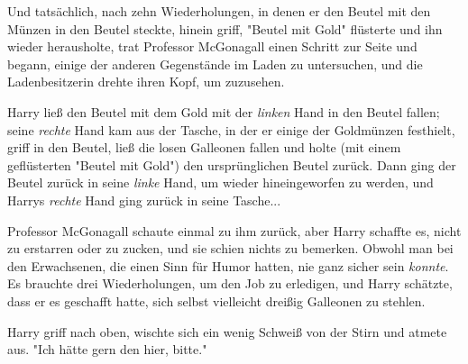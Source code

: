 Und tatsächlich, nach zehn Wiederholungen, in denen er den Beutel mit den Münzen in den Beutel steckte, hinein griff, "Beutel mit Gold" flüsterte und ihn wieder herausholte, trat Professor McGonagall einen Schritt zur Seite und begann, einige der anderen Gegenstände im Laden zu untersuchen, und die Ladenbesitzerin drehte ihren Kopf, um zuzusehen. 

Harry ließ den Beutel mit dem Gold mit der \emph{linken} Hand in den Beutel fallen; seine \emph{rechte} Hand kam aus der Tasche, in der er einige der Goldmünzen festhielt, griff in den Beutel, ließ die losen Galleonen fallen und holte (mit einem geflüsterten "Beutel mit Gold") den ursprünglichen Beutel zurück. Dann ging der Beutel zurück in seine \emph{linke} Hand, um wieder hineingeworfen zu werden, und Harrys \emph{rechte} Hand ging zurück in seine Tasche... 

Professor McGonagall schaute einmal zu ihm zurück, aber Harry schaffte es, nicht zu erstarren oder zu zucken, und sie schien nichts zu bemerken. Obwohl man bei den Erwachsenen, die einen Sinn für Humor hatten, nie ganz sicher sein \emph{konnte}. Es brauchte drei Wiederholungen, um den Job zu erledigen, und Harry schätzte, dass er es geschafft hatte, sich selbst vielleicht dreißig Galleonen zu stehlen. 

Harry griff nach oben, wischte sich ein wenig Schweiß von der Stirn und atmete aus.  "Ich hätte gern den hier, bitte." 

